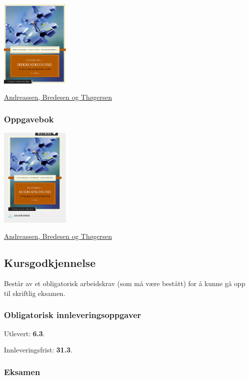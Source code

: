 \documentclass[
  letterpaper,
  DIV=11,
  numbers=noendperiod]{scrartcl}
\begin{document}
\includegraphics[width=0.25\textwidth,height=\textheight]{pensum.jpg}

\href{https://www.cappelendammundervisning.no/_innforing-i-mikrookonomi-9788202640521}{Andreassen,
Bredesen og Thøgersen}

\subsubsection{Oppgavebok}\label{oppgavebok}

\includegraphics[width=0.25\textwidth,height=\textheight]{oppgaver.jpg}

\href{https://www.cappelendammundervisning.no/_innforing-i-mikrookonomi-ovingsoppgaver-med-losningsforslag-9788202656485}{Andreassen,
Bredesen og Thøgersen}

\subsection{Kursgodkjennelse}\label{kursgodkjennelse}

Består av et obligatorisk arbeidskrav (som må være bestått) for å kunne
gå opp til skriftlig eksamen.

\subsubsection{Obligatorisk
innleveringsoppgaver}\label{obligatorisk-innleveringsoppgaver}

Utlevert: \textbf{6.3}.

Innleveringsfrist: \textbf{31.3}.

\subsubsection{Eksamen}\label{eksamen}
\end{document}

